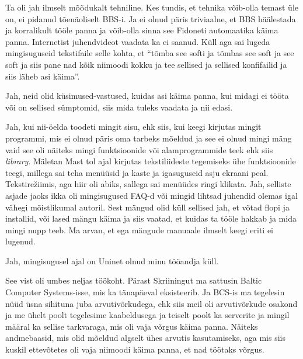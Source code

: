 
Ta oli jah ilmselt mõõdukalt tehniline. Kes tundis, et tehnika võib-olla temast 
üle on, ei pidanud tõenäoliselt BBS-i. Ja ei olnud päris triviaalne, et BBS 
häälestada ja korralikult tööle panna ja võib-olla sinna see Fidoneti 
automaatika käima panna. Internetist juhendvideot vaadata ka ei saanud. Küll 
aga sai lugeda mingisuguseid tekstifaile  selle kohta, et \enquote{tõmba see 
softi ja tõmbas see soft ja see soft ja siis pane nad kõik niimoodi kokku ja  
tee sellised ja sellised konfifailid ja siis läheb asi käima}.


Jah, neid  olid küsimused-vastused, kuidas asi käima panna, kui midagi ei tööta 
või on sellised sümptomid, siis mida tuleks vaadata ja nii edasi.


Jah, kui nii-öelda toodeti mingit sisu, ehk siis, kui keegi kirjutas mingit 
programmi, mis ei olnud  päris oma tarbeks mõeldud ja see ei olnud mingi mäng 
vaid see oli näiteks mingi funktsioonide või alamprogrammide teek ehk siis 
\emph{library}. Mäletan Mast tol ajal kirjutas 
tekstiliideste tegemiseks ühe funktsioonide teegi, millega sai teha menüüsid ja 
kaste ja igasuguseid asju ekraani peal. Tekstirežiimis, aga hiir oli  abiks, 
sallega sai menüüdes ringi klikata. Jah, selliste asjade jaoks ikka oli 
mingisugused FAQ-d või mingid lihtsad juhendid olemas igal vähegi mõistlikumal 
autoril. Sest mängud olid küll sellised jah, et võtad flopi ja installid, või 
lased mängu käima ja siis vaatad, et kuidas ta tööle hakkab ja mida mingi nupp 
teeb. Ma arvan, et ega mängude manuaale ilmselt keegi eriti ei lugenud.


Jah, mingisugusel ajal on Uninet  olnud minu tööandja küll.


See vist oli umbes neljas töökoht. Pärast Skriiningut ma sattusin Baltic 
Computer Systems-isse, mis ka tänapäeval 
eksisteerib. Ja BCS-is ma tegelesin  nüüd üsna sihituna juba arvutivõrkudega, 
ehk siis meil oli arvutivõrkude osakond ja me  ühelt poolt tegelesime 
kaabeldusega ja teiselt poolt  ka serverite ja mingil määral ka sellise 
tarkvaraga, mis  oli vaja võrgus käima panna. Näiteks andmebaasid, mis olid 
mõeldud algselt ühes arvutis kasutamiseks, aga mis siis kuskil ettevõtetes oli 
vaja niimoodi käima panna, et nad töötaks võrgus. 

